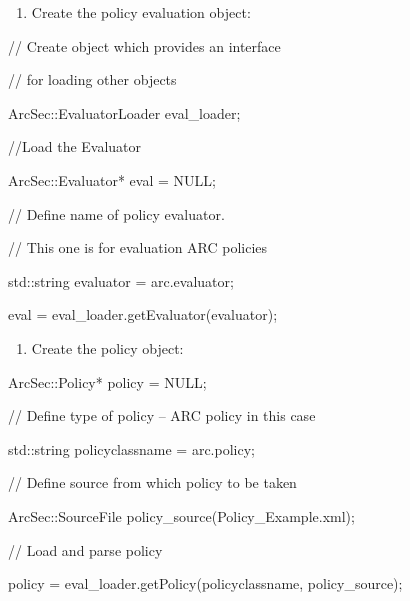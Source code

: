 \documentclass[a4paper]{article}
\newcommand\liststyleWWviiiNumiii{%
\renewcommand\theenumi{\alph{enumi}}
\renewcommand\theenumii{\arabic{enumii}}
\renewcommand\theenumiii{\arabic{enumiii}}
\renewcommand\theenumiv{\arabic{enumiv}}
\renewcommand\labelenumi{\theenumi)}
\renewcommand\labelenumii{\theenumii.}
\renewcommand\labelenumiii{\theenumiii.}
\renewcommand\labelenumiv{\theenumiv.}
}
\newcommand\liststyleWWviiiNumiv{%
\renewcommand\theenumi{\alph{enumi}}
\renewcommand\theenumii{\arabic{enumii}}
\renewcommand\theenumiii{\arabic{enumiii}}
\renewcommand\theenumiv{\arabic{enumiv}}
\renewcommand\labelenumi{\theenumi)}
\renewcommand\labelenumii{\theenumii.}
\renewcommand\labelenumiii{\theenumiii.}
\renewcommand\labelenumiv{\theenumiv.}
}
\begin{document}
\liststyleWWviiiNumiii
\begin{enumerate}
\item {\color{black}
Create the policy evaluation object:}
\end{enumerate}
{\ttfamily\color{black}
// Create object which provides an interface }

{\ttfamily\color{black}
// for loading other objects}

{\ttfamily\color{black}
ArcSec::EvaluatorLoader eval\_loader; }

{\ttfamily\color{black}
//Load the Evaluator }

{\ttfamily\color{black}
ArcSec::Evaluator* eval = NULL;}

{\ttfamily\color{black}
// Define name of policy evaluator.}

{\ttfamily\color{black}
// This one is for evaluation ARC policies}

{\ttfamily\color{black}
std::string evaluator = {\textquotedbl}arc.evaluator{\textquotedbl}; }

{\ttfamily\color{black}
eval = eval\_loader.getEvaluator(evaluator);}

\liststyleWWviiiNumiv
\begin{enumerate}
\item {\color{black}
Create the policy object:}
\end{enumerate}
{\ttfamily\color{black}
ArcSec::Policy* policy = NULL; }

{\ttfamily\color{black}
// Define type of policy -- ARC policy in this case}

{\ttfamily\color{black}
std::string policyclassname = {\textquotedbl}arc.policy{\textquotedbl};
}

{\ttfamily\color{black}
// Define source from which policy to be taken}

{\ttfamily\color{black}
ArcSec::SourceFile
policy\_source({\textquotedbl}Policy\_Example.xml{\textquotedbl}); }

{\ttfamily\color{black}
// Load and parse policy}

{\ttfamily\color{black}
policy = eval\_loader.getPolicy(policyclassname, policy\_source); }
\end{document}
